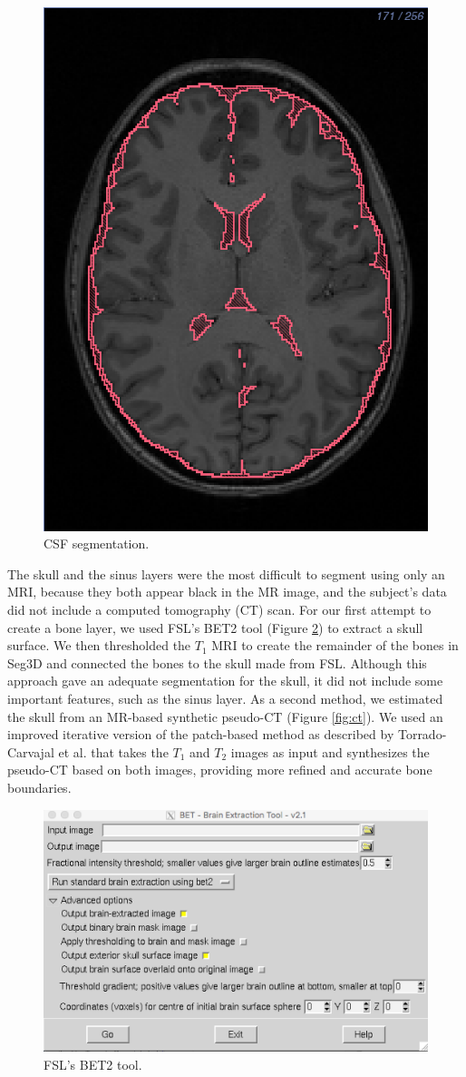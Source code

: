\begin{figure}[H]
\begin{center}
\includegraphics[width=.49\textwidth]{Figures/CSF_seg}
\caption{CSF segmentation.}
\label{fig:csf}
\end{center}
\end{figure}

The skull and the sinus layers were the most difficult to segment using only an MRI, because they both appear black in the MR image, and the subject's data did not include a computed tomography (CT) scan. For our first attempt to create a bone layer, we used FSL's BET2 tool (Figure \ref{fig:bet2}) to extract a skull surface. We then thresholded the $T_1$ MRI to create the remainder of the bones in Seg3D and connected the bones to the skull made from FSL. Although this approach gave an adequate segmentation for the skull, it did not include some important features, such as the sinus layer. As a second method, we estimated the skull from an MR-based synthetic pseudo-CT (Figure \ref{fig:ct}). We used an improved iterative version of the patch-based method as described by Torrado-Carvajal et al. \cite{ref:pseudoct} that takes the $T_1$ and $T_2$ images as input and synthesizes the pseudo-CT based on both images, providing more refined and accurate bone boundaries.

\begin{figure}[H]
\begin{center}
\includegraphics[width=.75\textwidth]{Figures/BET2}
\caption{FSL's BET2 tool.}
\label{fig:bet2}
\end{center}
\end{figure}

